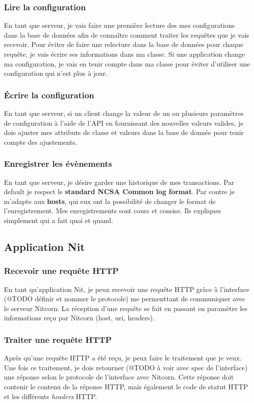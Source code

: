 \documentclass{scrreprt}
\begin{document}
\subsubsection{Lire la configuration}
En tant que serveur, je vais faire une première lecture des mes configurations
dans la base de données afin de connaître comment traiter les requêtes que je
vais recevoir.
Pour éviter de faire une relecture dans la base de données pour chaque requête,
je vais écrire ses informations dans ma classe.
Si une application change ma configuration, je vais en tenir compte dans ma
classe pour éviter d'utiliser une configuration qui n'est plus à jour.

\subsubsection{Écrire la configuration}
En tant que serveur, si un client change la valeur de un ou plusieurs paramètres
de configuration à l'aide de l'API en fournissant des nouvelles valeurs valides,
je dois ajuster mes attributs de classe et valeurs dans la base de donnée
pour tenir compte des ajustements.

\subsubsection{Enregistrer les évènements}
En tant que serveur, je désire garder une historique de mes transactions. Par
default je respect le \textbf{standard NCSA Common log format}. Par contre je m'adapte
aux \textbf{hosts}, qui eux ont la possibilité de changer le format de
l'enregistrement. Mes enregistrements sont cours et consise. Ils expliques
simplement qui a fait quoi et quand.

\subsection{Application Nit}
\subsubsection{Recevoir une requête HTTP}
En tant qu'application Nit, je peux recevoir une requête HTTP grâce à l'interface
(@TODO définir et nommer le protocole) me permenttant de communiquer avec le serveur
Nitcorn. La réception d'une requête se fait en passant en paramètre les informations
reçu par Nitcorn (host, uri, headers).

\subsubsection{Traiter une requête HTTP}
Après qu'une requête HTTP a été reçu, je peux faire le traitement que je veux.
Une fois ce traitement, je dois retourner (@TODO à voir avec spec de l'interface)
une réponse selon le protocole de l'interface avec Nitcorn. Cette réponse doit
contenir le contenu de la réponse HTTP, mais également le code de statut HTTP
et les différents \textit{headers} HTTP.
\end{document}
